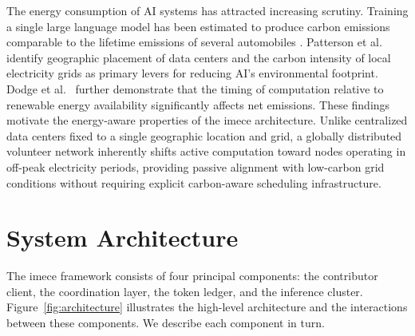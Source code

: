 \documentclass[12pt]{article}
\begin{document}
The energy consumption of AI systems has attracted increasing scrutiny. Training a single large language model has been estimated to produce carbon emissions comparable to the lifetime emissions of several automobiles \cite{strubell2019energy}. Patterson et al.\ \cite{patterson2021carbon} identify geographic placement of data centers and the carbon intensity of local electricity grids as primary levers for reducing AI's environmental footprint. Dodge et al.\ \cite{dodge2022measuring} further demonstrate that the timing of computation relative to renewable energy availability significantly affects net emissions. These findings motivate the energy-aware properties of the imece architecture. Unlike centralized data centers fixed to a single geographic location and grid, a globally distributed volunteer network inherently shifts active computation toward nodes operating in off-peak electricity periods, providing passive alignment with low-carbon grid conditions without requiring explicit carbon-aware scheduling infrastructure.

\section{System Architecture}
\label{sec:architecture}

The imece framework consists of four principal components: the contributor client, the coordination layer, the token ledger, and the inference cluster. Figure~\ref{fig:architecture} illustrates the high-level architecture and the interactions between these components. We describe each component in turn.
\end{document}
